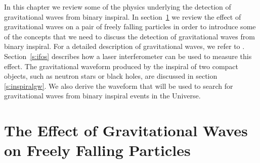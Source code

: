 
In this chapter we review some of the physics underlying the detection of
gravitational waves from binary inspiral.  In section~\ref{s:effect} we review
the effect of gravitational waves on a pair of freely falling particles in
order to introduce some of the concepts that we need to discuss the detection
of gravitational waves from binary inspiral.  For a detailed description of
gravitational waves, we refer to \cite{MTW73,Thorne:1982cv}.
Section~\ref{s:ifos} describes how a laser interferometer can be used to
measure this effect. The gravitational waveform produced by the inspiral of
two compact objects, such as neutron stars or black holes, are discussed in
section \ref{s:inspiralgw}. We also derive the waveform that will be used to
search for gravitational waves from binary inspiral events in the Universe.

\section{The Effect of Gravitational Waves on Freely Falling Particles}
\label{s:effect}

